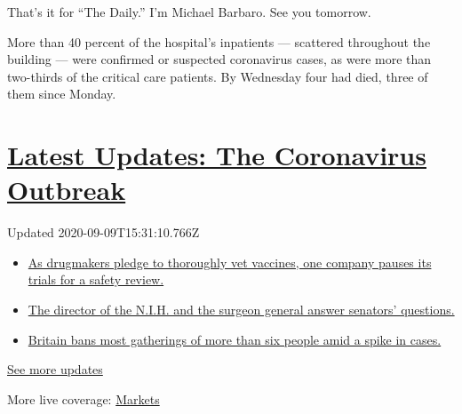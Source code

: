 That's it for ``The Daily.'' I'm Michael Barbaro. See you tomorrow.

More than 40 percent of the hospital's inpatients --- scattered
throughout the building --- were confirmed or suspected coronavirus
cases, as were more than two-thirds of the critical care patients. By
Wednesday four had died, three of them since Monday.

\hypertarget{latest-updates-the-coronavirus-outbreak}{%
\section{\texorpdfstring{\href{https://www.nytimes3xbfgragh.onion/2020/09/09/world/covid-19-coronavirus.html?action=click\&pgtype=Article\&state=default\&region=MAIN_CONTENT_1\&context=storylines_live_updates}{Latest
Updates: The Coronavirus
Outbreak}}{Latest Updates: The Coronavirus Outbreak}}\label{latest-updates-the-coronavirus-outbreak}}

Updated 2020-09-09T15:31:10.766Z

\begin{itemize}
\tightlist
\item
  \href{https://www.nytimes3xbfgragh.onion/2020/09/09/world/covid-19-coronavirus.html?action=click\&pgtype=Article\&state=default\&region=MAIN_CONTENT_1\&context=storylines_live_updates\#link-5b0bf0d1}{As
  drugmakers pledge to thoroughly vet vaccines, one company pauses its
  trials for a safety review.}
\item
  \href{https://www.nytimes3xbfgragh.onion/2020/09/09/world/covid-19-coronavirus.html?action=click\&pgtype=Article\&state=default\&region=MAIN_CONTENT_1\&context=storylines_live_updates\#link-6e2052bd}{The
  director of the N.I.H. and the surgeon general answer senators'
  questions.}
\item
  \href{https://www.nytimes3xbfgragh.onion/2020/09/09/world/covid-19-coronavirus.html?action=click\&pgtype=Article\&state=default\&region=MAIN_CONTENT_1\&context=storylines_live_updates\#link-74c78736}{Britain
  bans most gatherings of more than six people amid a spike in cases.}
\end{itemize}

\href{https://www.nytimes3xbfgragh.onion/2020/09/09/world/covid-19-coronavirus.html?action=click\&pgtype=Article\&state=default\&region=MAIN_CONTENT_1\&context=storylines_live_updates}{See
more updates}

More live coverage:
\href{https://www.nytimes3xbfgragh.onion/live/2020/09/09/business/stock-market-today-coronavirus?action=click\&pgtype=Article\&state=default\&region=MAIN_CONTENT_1\&context=storylines_live_updates}{Markets}

